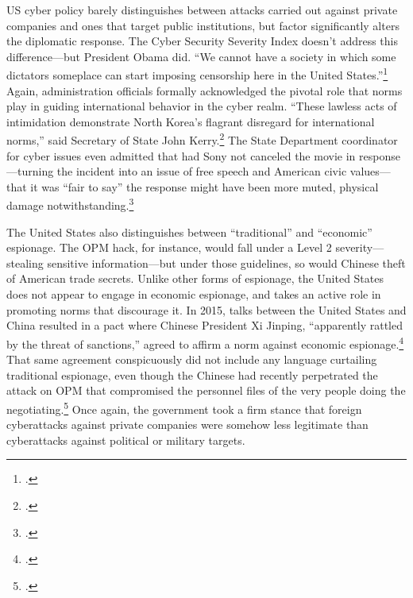 \documentclass{memoir}
\begin{document}
\begin{refsegment}
US cyber policy barely distinguishes between attacks carried out against private companies and ones that target public institutions, but factor significantly alters the diplomatic response. The Cyber Security Severity Index doesn't address this difference---but President Obama did. ``We cannot have a society in which some dictators someplace can start imposing censorship here in the United States.''\footcite{perez_obama_2014} Again, administration officials formally acknowledged the pivotal role that norms play in guiding international behavior in the cyber realm. ``These lawless acts of intimidation demonstrate North Korea's flagrant disregard for international norms,'' said Secretary of State John Kerry.\footcite{perez_obama_2014} The State Department coordinator for cyber issues even admitted that had Sony not canceled the movie in response---turning the incident into an issue of free speech and American civic values---that it was ``fair to say'' the response might have been more muted, physical damage notwithstanding.\footcite{nakashima_why_2015}


The United States also distinguishes between ``traditional'' and ``economic'' espionage. The OPM hack, for instance, would fall under a Level 2 severity---stealing sensitive information---but under those guidelines, so would Chinese theft of American trade secrets. Unlike other forms of espionage, the United States does not appear to engage in economic espionage, and takes an active role in promoting norms that discourage it. In 2015, talks between the United States and China resulted in a pact where Chinese President Xi Jinping, ``apparently rattled by the threat of sanctions,'' agreed to affirm a norm against economic espionage.\footcite{nakashima_u.s._2015} That same agreement conspicuously did not include any language curtailing traditional espionage, even though the Chinese had recently perpetrated the attack on OPM that compromised the personnel files of the very people doing the negotiating.\footcite{nakashima_u.s._2015} Once again, the government took a firm stance that foreign cyberattacks against private companies were somehow less legitimate than cyberattacks against political or military targets.


\end{refsegment}
\end{document}
